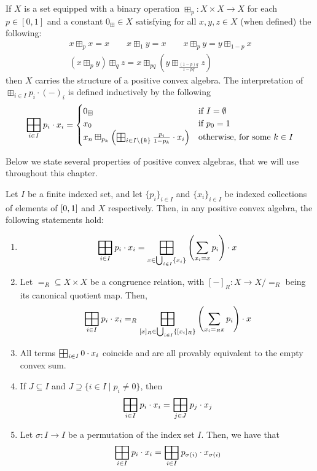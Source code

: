 \begin{proposition}\label{c4:prop:binary}
    If  $X$ is a set equipped with a binary operation $\boxplus_{p} : X \times X \to X$ for each $p \in [0,1]$ and a constant $0_\boxplus \in X$ satisfying for all $x,y,z \in X$ (when defined) the following:
    \begin{gather*}
        x \boxplus_{p} x = x \qquad x \boxplus_{1} y = x \qquad x \boxplus_{p} y = y \boxplus_{1-{p}} x \\ (x \boxplus_{p} y) \boxplus_{q} z = x \boxplus_{pq} \left(y \boxplus_{\frac{(1-p)q}{1-pq}} z\right)
    \end{gather*}
    then $X$ carries the structure of a positive convex algebra. The interpretation of $\boxplus_{i \in I} p_i \cdot (-)_{i}$ is defined inductively by the following
    $$\bigboxplus_{i \in I} p_i \cdot x_i = \begin{cases}
        0_\boxplus & \text{if } I = \emptyset \\
        x_0 & \text{if } p_0 = 1\\
        x_n \boxplus_{p_k} \left(\bigboxplus_{i \in I \setminus \{k\}} \frac{p_i}{1-{p_k}}\cdot x_i  \right) &\text{otherwise, for some } k \in I
    \end{cases} $$
\end{proposition}
Below we state several properties of positive convex algebras, that we will use throughout this chapter.
\begin{proposition}\label{c4:prop:properties_of_positive_convex_algebras}
    Let $I$ be a finite indexed set, and let $\{p_i\}_{i \in I}$ and $\{x_i\}_{i \in I}$ be indexed collections of elements of $\interval{0}{1}$ and $X$ respectively. Then, in any positive convex algebra, the following statements hold:
    \begin{enumerate}
        \item
        $${\bigboxplus_{i \in I} p_i \cdot x_i} = {\bigboxplus_{x \in \bigcup_{i \in I} \{x_i\}} \left(\sum_{x_i = x} p_i\right)\cdot x}$$
        \item Let ${=_R} \subseteq {X \times X}$ be a congruence relation, with $[-]_R \colon X \to X/{=_R}$ being its canonical quotient map. Then, 
        $${\bigboxplus_{i \in I} p_i \cdot x_i} =_R {\bigboxplus_{[x]_R \in \bigcup_{i \in I} \left\{[x_i]_R\right\}} \left(\sum_{x_i =_R x} p_i\right)\cdot x}$$
        \item All terms $\bigboxplus_{i \in I } 0 \cdot x_i $ coincide and are all provably equivalent to the empty convex sum.
        \item If $J \subseteq I$ and $J \supseteq \{i \in I \mid p_i \neq 0\}$, then 
        $$
        \bigboxplus_{i \in I} p_i \cdot x_i = \bigboxplus_{j \in J} p_j \cdot x_j
        $$
        \item Let $\sigma \colon I \to I$ be a permutation of the index set $I$. Then, we have that
        $$
        	\bigboxplus_{i \in I} p_i \cdot x_i = \bigboxplus_{i \in I} p_{\sigma(i)} \cdot x_{\sigma(i)}
        $$
    \end{enumerate}
\end{proposition}
